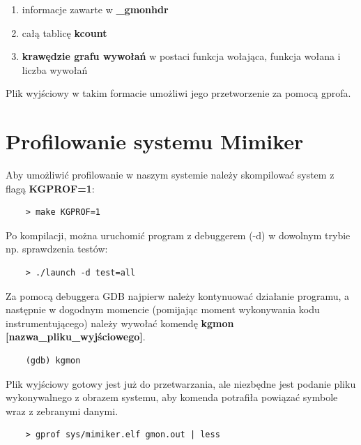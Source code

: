 \documentclass[shortabstract]{iithesis}
\theoremstyle{definition} \newtheorem*{definition}{Definicja}
\theoremstyle{definition} \newtheorem*{example}{Przykład}
\theoremstyle{definition} \newtheorem*{remark}{Uwaga}
\begin{document}
\begin{enumerate}
    \item informacje zawarte w \textbf{\_gmonhdr}
    \item całą tablicę \textbf{kcount}
    \item \textbf{krawędzie grafu wywołań} w postaci funkcja wołająca, funkcja wołana i liczba wywołań
\end{enumerate}

Plik wyjściowy w takim formacie umożliwi jego przetworzenie za pomocą gprofa.

\section{Profilowanie systemu Mimiker}

Aby umożliwić profilowanie w naszym systemie należy skompilować system z flagą \textbf{KGPROF=1}:

\begin{listing}[H]
  \begin{verbatim}
    > make KGPROF=1
\end{verbatim}
  \label{lst:makekgprofmimiker}
\end{listing}


Po kompilacji, można uruchomić program z debuggerem (-d) w dowolnym trybie np. sprawdzenia testów:

\begin{listing}[H]
  \begin{verbatim}
    > ./launch -d test=all
\end{verbatim}
  \label{lst:launchtestmimiker}
\end{listing}

Za pomocą debuggera GDB najpierw należy kontynuować działanie programu, a następnie w dogodnym momencie (pomijając moment wykonywania kodu instrumentującego) należy wywołać komendę \textbf{kgmon [nazwa\_pliku\_wyjściowego]}.


\begin{listing}[H]
  \begin{verbatim}
    (gdb) kgmon
\end{verbatim}
  \label{lst:dumpmimiker}
\end{listing}

Plik wyjściowy gotowy jest już do przetwarzania, ale niezbędne jest podanie pliku wykonywalnego z obrazem systemu, aby komenda potrafiła powiązać symbole wraz z zebranymi danymi.

\begin{listing}[H]
  \begin{verbatim}
    > gprof sys/mimiker.elf gmon.out | less
\end{verbatim}
  \label{lst:gprodmimiker}
\end{listing}
\end{document}
